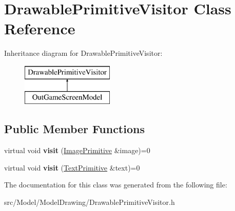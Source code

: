 \hypertarget{classDrawablePrimitiveVisitor}{}\section{Drawable\+Primitive\+Visitor Class Reference}
\label{classDrawablePrimitiveVisitor}
Inheritance diagram for Drawable\+Primitive\+Visitor\+:\begin{figure}[H]
\begin{center}
\leavevmode
\includegraphics[height=2.000000cm]{classDrawablePrimitiveVisitor}
\end{center}
\end{figure}
\subsection*{Public Member Functions}
\begin{DoxyCompactItemize}
\item 
virtual void {\bfseries visit} (\hyperlink{classImagePrimitive}{Image\+Primitive} \&image)=0\hypertarget{classDrawablePrimitiveVisitor_aeee35001af047b0da48f9e3238487ac1}{}\label{classDrawablePrimitiveVisitor_aeee35001af047b0da48f9e3238487ac1}

\item 
virtual void {\bfseries visit} (\hyperlink{classTextPrimitive}{Text\+Primitive} \&text)=0\hypertarget{classDrawablePrimitiveVisitor_a7c9f6866ddf9bc9cb4968d29bd5cada3}{}\label{classDrawablePrimitiveVisitor_a7c9f6866ddf9bc9cb4968d29bd5cada3}

\end{DoxyCompactItemize}


The documentation for this class was generated from the following file\+:\begin{DoxyCompactItemize}
\item 
src/\+Model/\+Model\+Drawing/Drawable\+Primitive\+Visitor.\+h\end{DoxyCompactItemize}
